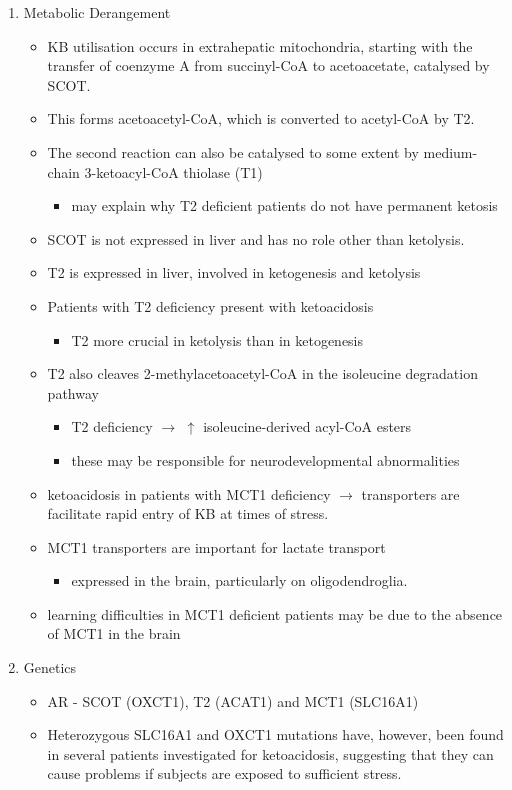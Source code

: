 \documentclass{scrartcl}
\begin{document}
\begin{enumerate}
\item Metabolic Derangement
\label{sec:org6e94686}
\begin{itemize}
\item KB utilisation occurs in extrahepatic mitochondria, starting with
the transfer of coenzyme A from succinyl-CoA to acetoacetate,
catalysed by SCOT.
\item This forms acetoacetyl-CoA, which is converted to acetyl-CoA by T2.
\item The second reaction can also be catalysed to some extent by
medium-chain 3-ketoacyl-CoA thiolase (T1)
\begin{itemize}
\item may explain why T2 deficient patients do not have permanent
ketosis
\end{itemize}
\item SCOT is not expressed in liver and has no role other than
ketolysis.
\item T2 is expressed in liver, involved in ketogenesis and ketolysis
\item Patients with T2 deficiency present with ketoacidosis
\begin{itemize}
\item T2 more crucial in ketolysis than in ketogenesis
\end{itemize}
\item T2 also cleaves 2-methylacetoacetyl-CoA in the isoleucine
degradation pathway
\begin{itemize}
\item T2 deficiency \(\to\) \(\uparrow\) isoleucine-derived acyl-CoA esters
\item these may be responsible for neurodevelopmental abnormalities
\end{itemize}
\item ketoacidosis in patients with MCT1 deficiency \(\to\) transporters are
facilitate rapid entry of KB at times of stress.
\item MCT1 transporters are important for lactate transport
\begin{itemize}
\item expressed in the brain, particularly on oligodendroglia.
\end{itemize}
\item learning difficulties in MCT1 deficient patients may be due to the
absence of MCT1 in the brain
\end{itemize}

\item Genetics
\label{sec:org701485d}
\begin{itemize}
\item AR - SCOT (OXCT1), T2 (ACAT1) and MCT1 (SLC16A1)
\item Heterozygous SLC16A1 and OXCT1 mutations have, however, been found
in several patients investigated for ketoacidosis, suggesting that
they can cause problems if subjects are exposed to sufficient stress.


\end{itemize}
\end{enumerate}
\end{document}
